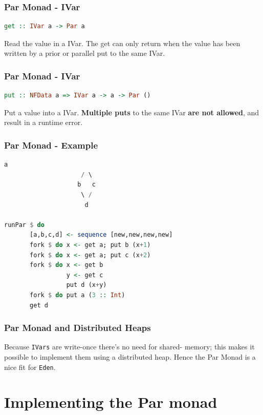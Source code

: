 \documentclass[12pt, danish]{beamer}
\begin{document}
\begin{frame}[fragile]
  \frametitle{Par Monad - IVar}
  \begin{lstlisting}[language=Haskell]
get :: IVar a -> Par a  
  \end{lstlisting}

  Read the value in a IVar. The get can only return when the value 
  has been written by a prior or parallel put to the same IVar.
  
\end{frame}

\begin{frame}[fragile]
  \frametitle{Par Monad - IVar}
  \begin{lstlisting}[language=Haskell]
put :: NFData a => IVar a -> a -> Par ()
  \end{lstlisting} 
    
  Put a value into a IVar. \textbf{Multiple puts} to the same IVar
  \textbf{are not  allowed}, and result in a runtime error.
    
\end{frame}

\begin{frame}[fragile]
  \frametitle{Par Monad - Example}
  \begin{lstlisting}[language=Haskell]
                      a
                     / \  
                    b   c
                     \ /
                      d
  
runPar $ do
       [a,b,c,d] <- sequence [new,new,new,new]
       fork $ do x <- get a; put b (x+1)
       fork $ do x <- get a; put c (x+2)
       fork $ do x <- get b
                 y <- get c 
                 put d (x+y)
       fork $ do put a (3 :: Int)
       get d
  \end{lstlisting}
\end{frame}

\begin{frame}
  \frametitle{Par Monad and Distributed Heaps}

  Because \texttt{IVars} are write-once there's no need for shared-
  memory; this makes it possible to implement them using a distributed
  heap. Hence the Par Monad is a nice fit for \texttt{Eden}.

\end{frame}

\section{Implementing the Par monad}
\end{document}
